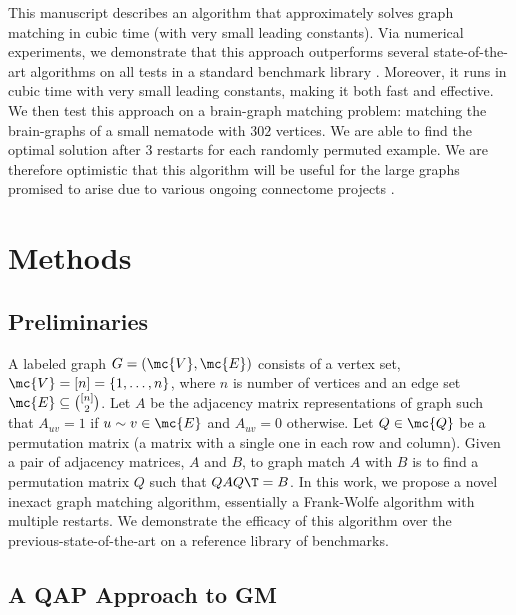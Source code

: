 \documentclass[10pt,journal,cspaper,compsoc]{IEEEtran}
\begin{document}
This manuscript describes an algorithm that approximately solves graph matching in cubic time (with very small leading constants).  Via numerical experiments, we demonstrate that this approach outperforms several state-of-the-art algorithms on all tests in a standard benchmark library \cite{Burkard1997}. Moreover, it runs in cubic time with very small leading constants, making it both fast and effective. We then test this approach on a brain-graph matching problem: matching the brain-graphs of a small nematode with $302$ vertices.  We are able to find the optimal solution after $3$ restarts for each randomly permuted example.  We are therefore optimistic that this algorithm will be useful for the large graphs promised to arise due to various ongoing connectome projects \cite{HCP,OCP}.










\section{Methods} %
\label{sec:methods}


\subsection{Preliminaries} %
\label{sub:preliminaries}


A labeled graph $G=(\mc{V},\mc{E})$ consists of a vertex set, $\mc{V}=[n]=\{1,\ldots, n\}$, where $n$ is number of vertices and an edge set $\mc{E} \subseteq \binom{[n]}{2}$.  Let $A$ be the adjacency matrix representations of graph such that $A_{uv}=1$ if $u \sim v \in \mc{E}$ and $A_{uv}=0$ otherwise.  Let $Q \in \mc{Q}$ be a permutation matrix (a matrix with a single one in each row and column).  Given a pair of adjacency matrices, $A$ and $B$, to graph match $A$ with $B$ is to find a permutation matrix $Q$ such that $QAQ\T=B$. In this work, we propose a novel inexact graph matching algorithm, essentially a Frank-Wolfe algorithm with multiple restarts.  We demonstrate the efficacy of this algorithm over the previous-state-of-the-art on a reference library of benchmarks.  

\subsection{A QAP Approach to GM} %
\label{ssub:graph_matching}
\end{document}
